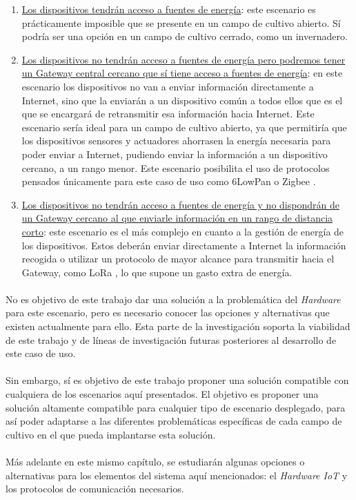 \documentclass[../../memoria.tex]{subfiles}
\begin{document}
\begin{enumerate}
    \item \uline{Los dispositivos tendrán acceso a fuentes de energía}: este escenario es prácticamente imposible que se presente en un campo de cultivo abierto. Sí podría ser una opción en un campo de cultivo cerrado, como un invernadero.

    \item \uline{Los dispositivos no tendrán acceso a fuentes de energía pero podremos tener un Gateway central cercano que sí tiene acceso a fuentes de energía}: en este escenario los dispositivos no van a enviar información directamente a Internet, sino que la enviarán a un dispositivo común a todos ellos que es el que se encargará de retransmitir esa información hacia Internet. Este escenario sería ideal para un campo de cultivo abierto, ya que permitiría que los dispositivos sensores y actuadores ahorrasen la energía necesaria para poder enviar a Internet, pudiendo enviar la información a un dispositivo cercano, a un rango menor. Este escenario posibilita el uso de protocolos pensados únicamente para este caso de uso como 6LowPan \cite{6lowpan} o Zigbee \cite{zigbee}.
    \item \uline{Los dispositivos no tendrán acceso a fuentes de energía y no dispondrán de un Gateway cercano al que enviarle información en un rango de distancia corto}: este escenario es el más complejo en cuanto a la gestión de energía de los dispositivos. Estos deberán enviar directamente a Internet la información recogida o utilizar un protocolo de mayor alcance para transmitir hacia el Gateway, como LoRa \cite{lora}, lo que supone un gasto extra de energía.
\end{enumerate}

\paragraph{}
No es objetivo de este trabajo dar una solución a la problemática del \textit{Hardware} para este escenario, pero es necesario conocer las opciones y alternativas que existen actualmente para ello. Esta parte de la investigación soporta la viabilidad de este trabajo y de líneas de investigación futuras posteriores al desarrollo de este caso de uso.

\paragraph{}
Sin embargo, sí es objetivo de este trabajo proponer una solución compatible con cualquiera de los escenarios aquí presentados. El objetivo es proponer una solución altamente compatible para cualquier tipo de escenario desplegado, para así poder adaptarse a las diferentes problemáticas específicas de cada campo de cultivo en el que pueda implantarse esta solución.

\paragraph{}
Más adelante en este mismo capítulo, se estudiarán algunas opciones o alternativas para los elementos del sistema aquí mencionados: el \textit{Hardware IoT} y los protocolos de comunicación necesarios.
\end{document}

